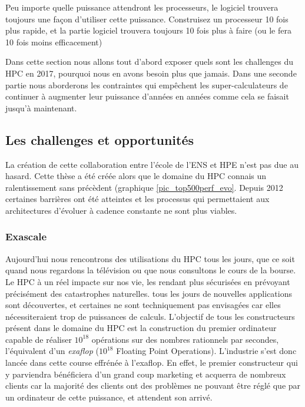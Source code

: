 \begin{fancyquotes}
Peu importe quelle puissance attendront les processeurs, le logiciel trouvera toujours une façon d'utiliser cette puissance. Construisez un processeur 10 fois plus rapide, et la partie logiciel trouvera toujours 10 fois plus à faire (ou le fera 10 fois moins efficacement)  \cite{sutter2005software}
\end{fancyquotes}


Dans cette section nous allons tout d'abord exposer quels sont les challenges du HPC en 2017, pourquoi nous en avons besoin plus que jamais. Dans une seconde partie nous aborderons les contraintes qui empêchent les super-calculateurs de continuer à augmenter leur puissance d'années en années comme cela se faisait jusqu'à maintenant.

\subsection{Les challenges et opportunités}

La création de cette collaboration entre l'école de l'ENS et HPE n'est pas due au hasard. Cette thèse a été créée alors que le domaine du HPC connais un ralentissement sans précèdent (graphique \ref{pic_top500perf_evo}. Depuis 2012 certaines barrières ont été atteintes et les processus qui permettaient aux architectures d'évoluer à cadence constante ne sont plus viables. 




\subsubsection{Exascale}
Aujourd'hui nous rencontrons des utilisations du HPC tous les jours, que ce soit quand nous regardons la télévision ou que nous consultons le cours de la bourse. Le HPC à un réel impacte sur nos vie, les rendant plus sécurisées en prévoyant précisément des catastrophes naturelles. tous les jours de nouvelles applications sont découvertes, et certaines ne sont techniquement pas envisagées car elles nécessiteraient trop de puissances de calculs. L'objectif de tous les constructeurs présent dans le domaine du HPC est la construction du premier ordinateur capable de réaliser  $10^18$ opérations sur des nombres rationnels par secondes, l'équivalent d'un \textit{exaflop} ($10^18$ Floating Point Operations). L'industrie s'est donc lancée dans cette course effrénée à l'exaflop. En effet, le premier constructeur qui y parviendra bénéficiera d'un grand coup marketing et acquerra de nombreux clients car la majorité des clients ont des problèmes ne pouvant être réglé que par un ordinateur de cette puissance, et attendent son arrivé.

